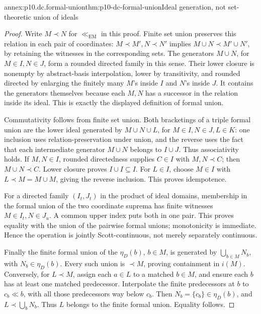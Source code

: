 \begin{annexitem}{annex:p10.dc.formal-union}{thm:p10-dc-formal-union}{Ideal generation, not set-theoretic union of ideals}
\begin{proof}
Write \(M\prec N\) for \(\ll_{\mathrm{EM}}\) in this proof.
Finite set union preserves this relation in each pair of coordinates:
\(M\prec M',N\prec N'\) implies \(M\cup N\prec M'\cup N'\),
by retaining the witnesses in the corresponding sets.
The generators \(M\cup N\), for \(M\in I,N\in J\), form a
rounded directed family in this sense. Their lower closure is nonempty
by abstract-basis interpolation, lower by transitivity, and rounded
directed by enlarging the finitely many \(M\)'s inside \(I\) and
\(N\)'s inside \(J\). It contains the generators themselves because
each \(M,N\) has a successor in the relation inside its ideal.
This is exactly the displayed definition of formal union.

Commutativity follows from finite set union. Both bracketings of a
triple formal union are the lower ideal generated by
\(M\cup N\cup L\), for \(M\in I,N\in J,L\in K\): one inclusion
uses relation-preservation under union, and the reverse uses the fact
that each intermediate generator \(M\cup N\) belongs to \(I\cup J\).
Thus associativity holds. If \(M,N\in I\), rounded directedness
supplies \(C\in I\) with \(M,N\prec C\); then \(M\cup N\prec C\).
Lower closure proves \(I\cup I\subseteq I\). For \(L\in I\),
choose \(M\in I\) with \(L\prec M=M\cup M\), giving the reverse
inclusion. This proves idempotence.

For a directed family \((I_t,J_t)\) in the product of ideal domains,
membership in the formal union of the two coordinate suprema has
finite witnesses \(M\in I_t,N\in J_u\). A common upper index puts
both in one pair. This proves equality with the union of the pairwise
formal unions; monotonicity is immediate. Hence the operation is jointly
Scott-continuous, not merely separately continuous.

Finally the finite formal union of the \(\eta_D(b)\), \(b\in M\),
is generated by \(\bigcup_{b\in M}N_b\), with \(N_b\in\eta_D(b)\).
Every such union is \(\prec M\), proving containment in \(i(M)\).
Conversely, for \(L\prec M\), assign each \(a\in L\) to a matched
\(b\in M\), and ensure each \(b\) has at least one matched
predecessor. Interpolate the finite predecessors at \(b\) to
\(c_b\ll b\), with all those predecessors way below \(c_b\).
Then \(N_b=\{c_b\}\in\eta_D(b)\), and
\(L\prec\bigcup_bN_b\). Thus \(L\) belongs to the finite formal
union. Equality follows.
\end{proof}
\end{annexitem}

